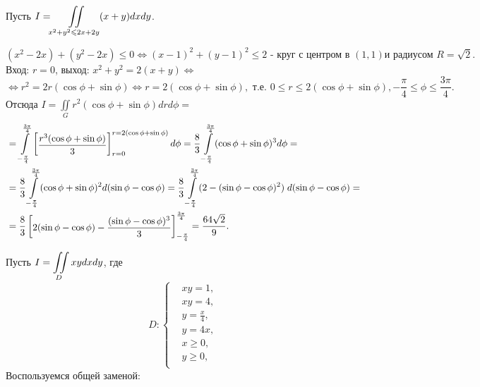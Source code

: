 \begin{examples}
  \item Пусть $I = \displaystyle\iint\limits_{x^2 + y^2 \leqslant 2x + 2y}(x + y)dxdy$. 
  
	\begin{equation*}
		(x^2 - 2x) + (y^2 - 2x) \leqslant 0 \Leftrightarrow
		(x - 1)^2 + (y - 1)^2 \leqslant 2 \text{ - круг с центром в $(1, 1)$
		и радиусом $R = \sqrt{2}$}.
	\end{equation*}
	Вход: $r = 0$, выход: $x^2 + y^2 = 2(x + y) \Leftrightarrow$
	\begin{equation*}
		\Leftrightarrow r^2 = 2r(\cos \phi + \sin \phi) \Leftrightarrow
		r = 2(\cos \phi + \sin \phi), \text{ т.е. } 0 \leqslant r \leqslant
		2(\cos \phi + \sin \phi), -\frac{\pi}{4} \leqslant \phi \leqslant \frac{3 \pi}{4}.
	\end{equation*}
	Отсюда $I = \iint\limits_G r^2 (\cos \phi + \sin \phi) dr d \phi =$ 
	\begin{equation*}
		\begin{split}
			&=\int\limits_{-\frac{\pi}{4}}^{\frac{3\pi}{4}}\left[\begin{matrix}\dfrac{r^3(\cos \phi + \sin \phi)}{3}\end{matrix}\right]_
			{r = 0}^{r = 2(\cos \phi + \sin \phi)}d\phi =
			\dfrac{8}{3}\int\limits_{-\frac{\pi}{4}}^{\frac{3\pi}{4}}
			(\cos \phi + \sin \phi)^3d\phi
			=\\
			&=\dfrac{8}{3}\int\limits_{-\frac{\pi}{4}}^{\frac{3\pi}{4}}
			(\cos \phi + \sin \phi)^2d(\sin \phi - \cos \phi)=
			\dfrac{8}{3}\int\limits_{-\frac{\pi}{4}}^{\frac{3\pi}{4}}
			(2 -( \sin \phi - \cos \phi)^2)\; d(\sin \phi - \cos \phi)=\\
			&=\dfrac{8}{3}\left[\begin{matrix}2(\sin \phi - \cos \phi) -
			  \dfrac{(\sin \phi - \cos \phi)^3}{3}\end{matrix}\right]_{-\frac{\pi}{4}}^{\frac{3\pi}{4}} = \dfrac{64\sqrt{2}}{9}.
		\end{split}
	\end{equation*}
  \item Пусть $I = \displaystyle\iint\limits_Dxydxdy$, где
	\begin{equation*}
		D:
		\begin{cases}
			&xy = 1,\\
			&xy = 4,\\
			&y = \frac{x}{4},\\
			&y = 4x,\\
			&x \geqslant 0,\\
			&y \geqslant 0,\\
		\end{cases}
	\end{equation*}
	Воспользуемся общей заменой:

\end{examples}
